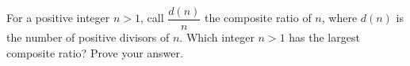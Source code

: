 For a positive integer $n>1$, call $\dfrac{d(n)}{n}$ the composite ratio of $n$, where $d(n)$ is the number of positive divisors of $n$. Which integer $n>1$ has the largest composite ratio? Prove your answer.
